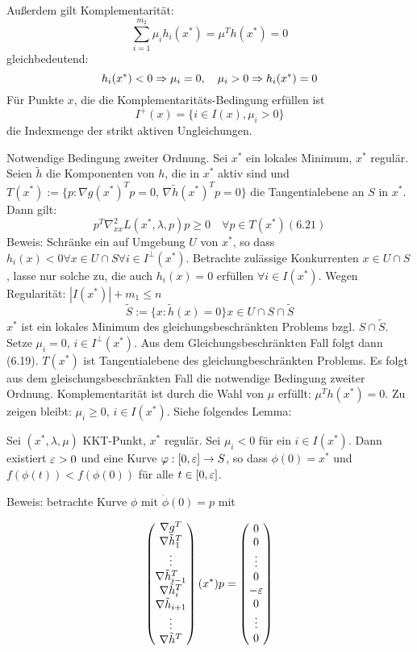 Außerdem gilt Komplementarität:
\[ \sum\limits_{i=1}^{m_2} \mu_i h_i(x^*) = \mu^T h(x^*) = 0 \]
gleichbedeutend:
\[ h_i(x^*) < 0 \Rightarrow \mu_i = 0, \quad \mu_i > 0 \Rightarrow h_i(x^*) = 0 \]
Für Punkte $x$, die die Komplementaritäts-Bedingung erfüllen ist 
\[ I^+(x) = \{ i \in I(x), \mu_i > 0 \} \]
die Indexmenge der strikt aktiven Ungleichungen.
\item Notwendige Bedingung zweiter Ordnung.
Sei $x^*$ ein lokales Minimum, $x^*$ regulär. Seien $\tilde h$ die Komponenten von $h$, die in $x^*$ aktiv  sind und $T(x^*) := \{ p : \nabla g(x^*)^T p = 0$, $\nabla \tilde h(x^*)^T p = 0 \}$ die Tangentialebene an $S$ in $x^*$. Dann gilt:
\[ p^T \nabla_{xx}^2 L(x^*, \lambda, p)p \geq 0 \quad \forall p \in T(x^*) (6.21) \]
Beweis: Schränke ein auf Umgebung $U$ von $x^*$, so dass $h_i(x) < 0 \forall x \in U \cap S \forall i \in I^\perp (x^*)$. Betrachte zulässige Konkurrenten $x \in U\cap S$, lasse nur solche zu, die auch $h_i(x) = 0$ erfüllen $\forall i \in I(x^*)$. Wegen Regularität: $|I(x^*)| + m_1 \leq n$
\[ \tilde S := \{ x: \tilde h(x) = 0 \} x \in U \cap S \cap \tilde S \]
$x^*$ ist ein lokales Minimum des gleichungsbeschränkten Problems bzgl. $S \cap \tilde S$.
Setze $\mu_i = 0$, $i \in I^\perp (x^*)$.
Aus dem Gleichungsbeschränkten Fall folgt dann (6.19).
$T(x^*)$ ist Tangentialebene des gleichungbeschränkten Problems. Es folgt aus dem gleischungsbeschränkten Fall die notwendige Bedingung zweiter Ordnung.
Komplementarität ist durch die Wahl von $\mu$ erfüllt: $\mu^T h(x^*) = 0$.
Zu zeigen bleibt: $\mu_i \geq 0$, $i \in I(x^*)$. Siehe folgendes Lemma:
\eitm


Sei $(x^*, \lambda, \mu)$ KKT-Punkt, $x^*$ regulär. Sei $\mu_i < 0$ für ein $i \in I(x^*)$. Dann existiert $\varepsilon > 0$ und eine Kurve $\varphi: [0,\varepsilon] \to S$, so dass $\phi(0) = x^*$ und $f(\phi(t)) < f(\phi(0))$ für alle $t\in[0,\varepsilon]$.

Beweis: betrachte Kurve $\phi$ mit $\dot \phi(0) = p$ mit

\begin{align*}
\begin{pmatrix} \nabla g^T \\ \nabla \tilde h_1^T \\ \vdots \\ \nabla \tilde h_{i-1}^T \\ \nabla \tilde h_i^T \\ \nabla \tilde h_{i+1} \\ \vdots \\ \nabla \tilde h^T \end{pmatrix} (x^*) p = \begin{pmatrix} 0 \\ 0 \\ \vdots \\ 0 \\ -\varepsilon \\ 0 \\ \vdots \\ 0 \end{pmatrix}
\end{align*}

